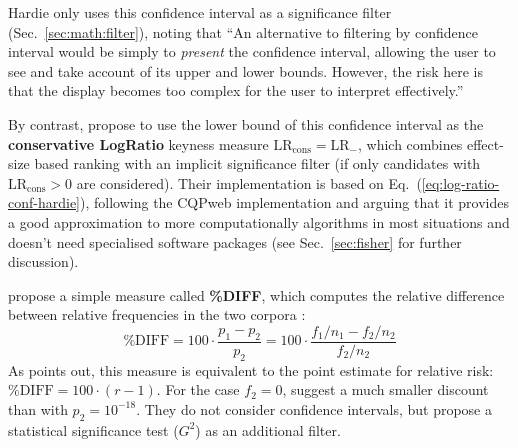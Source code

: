 \documentclass[a4paper]{article}
\newcommand{\LLR}{G^2}          %
\newcommand{\LR}{\text{LR}}     %
\newcommand{\LRC}{\text{LR}_{\text{cons}}} %
\newcommand{\pDIFF}{\text{\%DIFF}}     %
\begin{document}
Hardie only uses this confidence interval as a significance filter (Sec.~\ref{sec:math:filter}), noting that ``An alternative to filtering by confidence interval would be simply to \emph{present} the confidence interval, allowing the user to see and take account of its upper and lower bounds. However, the risk here is that the display becomes too complex for the user to interpret effectively.'' \citep[50]{Hardie:14}

By contrast, \citet{Evert:Dykes:Peters:18} propose to use the lower bound of this confidence interval as the \textbf{conservative LogRatio} keyness measure $\LRC = \LR_{-}$, which combines effect-size based ranking with an implicit significance filter (if only candidates with $\LRC > 0$ are considered).  Their implementation is based on Eq.~(\ref{eq:log-ratio-conf-hardie}), following the CQPweb implementation and arguing that it provides a good approximation to more computationally algorithms in most situations and doesn't need specialised software packages (see Sec.~\ref{sec:fisher} for further discussion).



\citet{Gabrielatos:Marchi:12} propose a simple measure called \textbf{\%DIFF}, which computes the relative difference between relative frequencies in the two corpora \citep[see also][]{Gabrielatos:18}:
\begin{equation}
  \label{eq:perc-diff}
  \pDIFF = 100\cdot \frac{ p_1 - p_2 }{ p_2 }
  = 100\cdot \frac{
    f_1 / n_1 - f_2 / n_2
  }{
    f_2 / n_2
  }
\end{equation}
As \citet[22]{Hardie:14} points out, this measure is equivalent to the point estimate for relative risk: $\pDIFF = 100\cdot (r - 1)$.  For the case $f_2 = 0$, \citet{Gabrielatos:Marchi:12} suggest a much smaller discount than \citet{Hardie:14} with $p_2 = 10^{-18}$.  They do not consider confidence intervals, but propose a statistical significance test ($\LLR$) as an additional filter.
\end{document}
